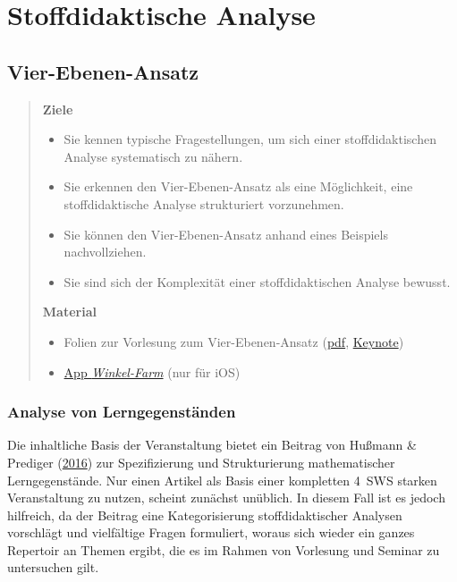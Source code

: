 \documentclass[
]{scrbook}
\providecommand{\tightlist}{%
  \setlength{\itemsep}{0pt}\setlength{\parskip}{0pt}}
\theoremstyle{definition}
\theoremstyle{definition}
\theoremstyle{definition}
\theoremstyle{definition}
\theoremstyle{remark}
\begin{document}
\hypertarget{part-stoffdidaktische-analyse}{%
\part*{Stoffdidaktische Analyse}\label{part-stoffdidaktische-analyse}}

\hypertarget{vier-ebenen-ansatz}{%
\chapter{Vier-Ebenen-Ansatz}\label{vier-ebenen-ansatz}}

\begin{quote}
\textbf{Ziele}

\begin{itemize}
\tightlist
\item
  Sie kennen typische Fragestellungen, um sich einer stoffdidaktischen Analyse systematisch zu nähern.
\item
  Sie erkennen den Vier-Ebenen-Ansatz als eine Möglichkeit, eine stoffdidaktische Analyse strukturiert vorzunehmen.
\item
  Sie können den Vier-Ebenen-Ansatz anhand eines Beispiels nachvollziehen.
\item
  Sie sind sich der Komplexität einer stoffdidaktischen Analyse bewusst.
\end{itemize}

\textbf{Material}

\begin{itemize}
\tightlist
\item
  Folien zur Vorlesung zum Vier-Ebenen-Ansatz (\href{files/Stoffdidaktik-WiSe2223-Kap1.pdf}{pdf}, \href{files/Stoffdidaktik-WiSe2223-Kap1.key}{Keynote})
\item
  \href{https://apps.apple.com/de/app/winkel-farm/id1369585218}{App \emph{Winkel-Farm}} (nur für iOS)
\end{itemize}
\end{quote}

\hypertarget{analyse-von-lerngegenstuxe4nden}{%
\section{Analyse von Lerngegenständen}\label{analyse-von-lerngegenstuxe4nden}}

Die inhaltliche Basis der Veranstaltung bietet ein Beitrag von Hußmann \& Prediger (\protect\hyperlink{ref-Hussmann:2016}{2016}) zur Spezifizierung und Strukturierung mathematischer Lerngegenstände. Nur einen Artikel als Basis einer kompletten 4~SWS starken Veranstaltung zu nutzen, scheint zunächst unüblich. In diesem Fall ist es jedoch hilfreich, da der Beitrag eine Kategorisierung stoffdidaktischer Analysen vorschlägt und vielfältige Fragen formuliert, woraus sich wieder ein ganzes Repertoir an Themen ergibt, die es im Rahmen von Vorlesung und Seminar zu untersuchen gilt.
\end{document}
